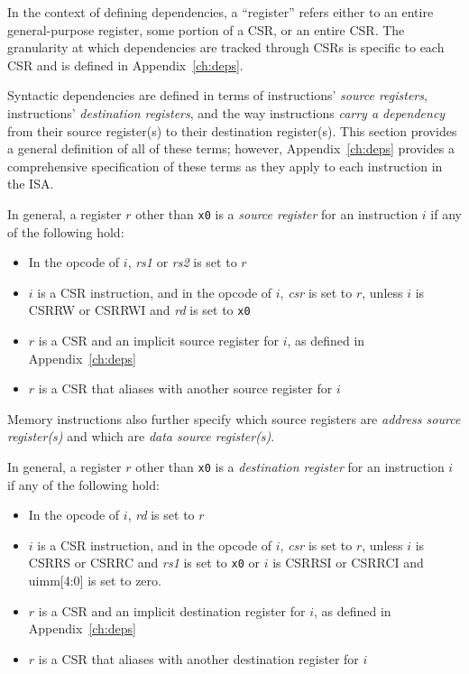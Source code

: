 In the context of defining dependencies, a ``register'' refers either to an entire general-purpose register, some portion of a CSR, or an entire CSR.  The granularity at which dependencies are tracked through CSRs is specific to each CSR and is defined in Appendix~\ref{ch:deps}.

Syntactic dependencies are defined in terms of instructions' {\em source registers}, instructions' {\em destination registers}, and the way instructions {\em carry a dependency} from their source register(s) to their destination register(s).
This section provides a general definition of all of these terms; however, Appendix~\ref{ch:deps} provides a comprehensive specification of these terms as they apply to each instruction in the ISA.

In general, a register $r$ other than {\tt x0} is a {\em source register} for an instruction $i$ if any of the following hold:
\begin{itemize}
  \item In the opcode of $i$, {\em rs1} or {\em rs2} is set to $r$
  \item $i$ is a CSR instruction, and in the opcode of $i$, {\em csr} is set to $r$, unless $i$ is CSRRW or CSRRWI and {\em rd} is set to {\tt x0}
  \item $r$ is a CSR and an implicit source register for $i$, as defined in Appendix~\ref{ch:deps}
  \item $r$ is a CSR that aliases with another source register for $i$
\end{itemize}
Memory instructions also further specify which source registers are {\em address source register(s)} and which are {\em data source register(s)}.

In general, a register $r$ other than {\tt x0} is a {\em destination register} for an instruction $i$ if any of the following hold:
\begin{itemize}
  \item In the opcode of $i$, {\em rd} is set to $r$
  \item $i$ is a CSR instruction, and in the opcode of $i$, {\em csr} is set to $r$, unless $i$ is CSRRS or CSRRC and {\em rs1} is set to {\tt x0} or $i$ is CSRRSI or CSRRCI and uimm[4:0] is set to zero.
  \item $r$ is a CSR and an implicit destination register for $i$, as defined in Appendix~\ref{ch:deps}
  \item $r$ is a CSR that aliases with another destination register for $i$
\end{itemize}

